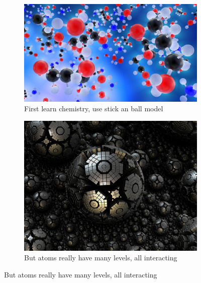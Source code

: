 \documentclass[]{article}
\begin{document}
\begin{figure}[H]
	\caption{Chemical Complexity}\label{fig:ChemicalComplexity} 
	
	\begin{subfigure}[b]{0.45\textwidth}
		\centering
		\caption{First learn chemistry, use stick an ball model}
		\includegraphics[width=\textwidth]{ChemicalComplexity}
	\end{subfigure}
	\begin{subfigure}[b]{0.45\textwidth}
		\centering
		\caption{But atoms really have many levels, all interacting}
		\includegraphics[width=\textwidth]{ChemicalComplexity1}
	\end{subfigure}
\end{figure}
\end{document}
